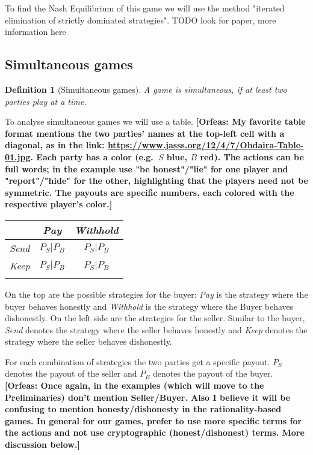 \documentclass{cacthesis}
\newcommand{\authnote}[3]{{ \footnotesize \textbf{#1[#2: #3]~}}}
\newcommand{\orfnote}[1]{\authnote{\color{blue}}{Orfeas}{#1}}
\newtheorem{definition}{Definition}
\begin{document}
To find the Nash Equilibrium of this game we will use the method "iterated elimination of strictly dominated strategies".
TODO look for paper,  more information here

\subsection{Simultaneous games}
\begin{definition}[Simultaneous games]
\label{def:simultaneous-game}
A game is simultaneous, if at least two parties play at a time. 
\end{definition}

To analyse simultaneous games we will use a table.
\orfnote{My favorite table format mentions the two parties' names at the
top-left cell with a diagonal, as in the link:
\url{https://www.jasss.org/12/4/7/Ohdaira-Table-01.jpg}. Each party has a color
(e.g.\ $S$ blue, $B$ red). The actions can be full words; in the example use "be
honest"/"lie" for one player and "report"/"hide" for the other, highlighting
that the players need not be symmetric. The payouts are specific numbers,
each colored with the respective player's color.}
\begin{center}
\begin{tabular}{ c||c|c| }
& \emph{Pay} & \emph{Withhold}  \\
\hline
\hline
\emph{Send} & $P_S | P_B$ & $P_S | P_B$ \\
\hline
\emph{Keep} & $P_S | P_B$ & $P_S | P_B$ \\ 
\hline
\label{tab:example-table}
\end{tabular}
\end{center}

On the top are the possible strategies for the buyer: \emph{Pay} is the strategy where the buyer behaves honestly and \emph{Withhold} is the strategy where the Buyer behaves dishonestly.\newline
On the left side are the strategies for the seller. Similar to the buyer, \emph{Send} denotes the strategy where the seller behaves honestly and \emph{Keep} denotes the strategy where the seller behaves dishonestly.\newline

For each combination of strategies the two parties get a specific payout. $P_S$ denotes the payout of the seller and $P_B$ denotes the payout of the buyer.
\orfnote{Once again, in the examples (which will move to the Preliminaries)
don't mention Seller/Buyer. Also I believe it will be confusing to mention
honesty/dishonesty in the rationality-based games. In general for our games,
prefer to use more specific terms for the actions and not use cryptographic
(honest/dishonest) terms. More discussion below.}
\end{document}
